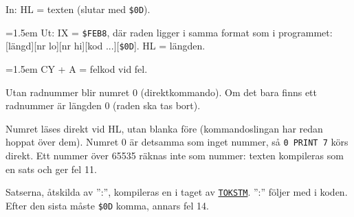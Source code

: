 \begin{Listing}
\Gap
{}
\begin{Note}\par\noindent In:  HL = texten (slutar med \texttt{\$0D}).\par
\par\noindent\hangindent=1.5em Ut:  IX = \texttt{\$FEB8}, där raden ligger i samma format som i programmet: [längd][nr lo][nr hi][kod ...][\texttt{\$0D}].  HL = längden.\par
\par\noindent\hangindent=1.5em CY + A = felkod vid fel.\par
\par\noindent Utan radnummer blir numret 0 (direktkommando). Om det bara finns ett radnummer är längden 0 (raden ska tas bort).\par
\par\noindent Numret läses direkt vid HL, utan blanka före (kommandoslingan har redan hoppat över dem). Numret 0 är detsamma som inget nummer, så \texttt{0 PRINT 7} körs direkt. Ett nummer över 65535 räknas inte som nummer: texten kompileras som en sats och ger fel 11.\par
\par\noindent Satserna, åtskilda av ”:”, kompileras en i taget av \hyperlink{l:TOKSTM}{\texttt{TOKSTM}}. ”:” följer med i koden. Efter den sista måste \texttt{\$0D} komma, annars fel 14.\par\end{Note}

\end{Listing}
